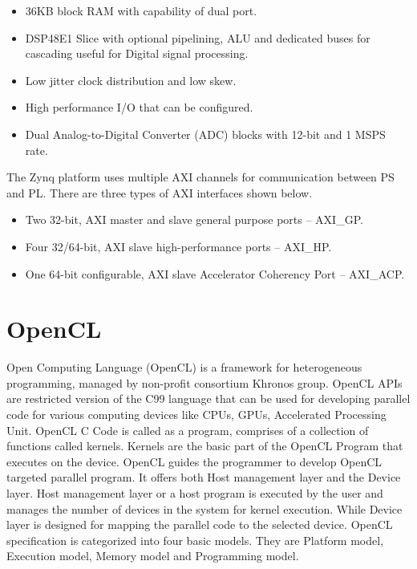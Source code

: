 \begin{itemize}\itemsep0em 
	\item 36KB block RAM with capability of dual port.
	\item DSP48E1 Slice with optional pipelining, ALU and dedicated buses for cascading useful for Digital signal processing.
	\item Low jitter clock distribution and low skew.
	\item High performance I/O that can be configured.
	\item Dual Analog-to-Digital Converter (ADC) blocks with 12-bit and 1 MSPS rate.
\end{itemize}

The Zynq platform uses multiple AXI channels for communication between PS and PL. There are three types of AXI interfaces shown below.
\begin{itemize}\itemsep0em 
	\item Two 32-bit, AXI master and slave general purpose ports -- AXI\_GP.
	\item Four 32/64-bit, AXI slave high-performance ports -- AXI\_HP.
	\item One 64-bit configurable, AXI slave Accelerator Coherency Port -- AXI\_ACP.
\end{itemize}

\section{OpenCL}
Open Computing Language (OpenCL) is a framework for heterogeneous programming, managed by non-profit consortium Khronos group. OpenCL APIs are restricted version of the C99 language that can be used for developing parallel code for various computing devices like CPUs, GPUs, Accelerated Processing Unit. OpenCL C Code is called as a program, comprises of a collection of functions called kernels. Kernels are the basic part of the OpenCL Program that executes on the device. OpenCL guides the programmer to develop OpenCL targeted parallel program. It offers both Host management layer and the Device layer. Host management layer or a host program is executed by the user and manages the number of devices in the system for kernel execution. While Device layer is designed for mapping the parallel code to the selected device. OpenCL specification is categorized into four basic models. They are Platform model, Execution model, Memory model and Programming model.

